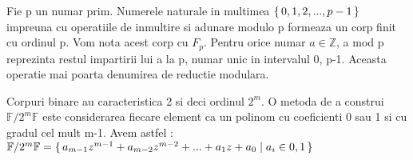 \begin{dfn}
Fie p un numar prim. Numerele naturale in multimea $\set {0, 1, 2, ... , p-1 }$ impreuna cu operatiile de inmultire si adunare modulo p formeaza un corp finit cu ordinul p. Vom nota acest corp cu $F_p$. Pentru orice numar $a\in\mathbb{Z}$, a mod p reprezinta restul impartirii lui a la p, numar unic in intervalul 0, p-1. Aceasta operatie mai poarta denumirea de reductie modulara.
\end{dfn}

\begin{dfn}
Corpuri binare au caracteristica 2 si deci ordinul $2^{m}$. O metoda de a construi $\mathbb{F}/2^{m}\mathbb{F}$ este considerarea fiecare element ca un polinom cu coeficienti 0 sau 1 si cu gradul cel mult m-1. Avem astfel : 
 $\mathbb{F}/2^{m}\mathbb{F} = \set {a_{m-1}z^{m-1} + a_{m-2}z^{m-2} + ... + a_{1}z + a_{0}\mid a_{i}\in {0,1}}$
\end{dfn}



